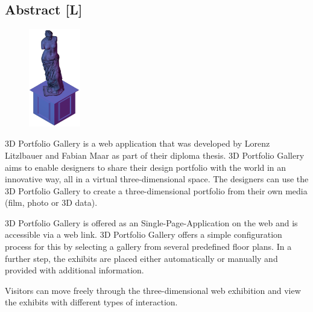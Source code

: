 \begin{spacing}{1}
    \chapter*{Abstract [L]}
\end{spacing}
\begin{figure}
    \begin{center}
      \includegraphics[width=0.2\textwidth]{pics/statue.png}
    \end{center}
\end{figure}
3D Portfolio Gallery is a web application that was developed by Lorenz Litzlbauer and Fabian Maar as part of their diploma thesis. 3D Portfolio Gallery aims to enable designers to share their design portfolio with the world in an innovative way, all in a virtual three-dimensional space. The designers can use the 3D Portfolio Gallery to create a three-dimensional portfolio from their own media (film, photo or 3D data).

3D Portfolio Gallery is offered as an Single-Page-Application on the web and is accessible via a web link. 3D Portfolio Gallery offers a simple configuration process for this by selecting a gallery from several predefined floor plans. In a further step, the exhibits are placed either automatically or manually and provided with additional information.

Visitors can move freely through the three-dimensional
web exhibition and view the exhibits with different types of interaction.

